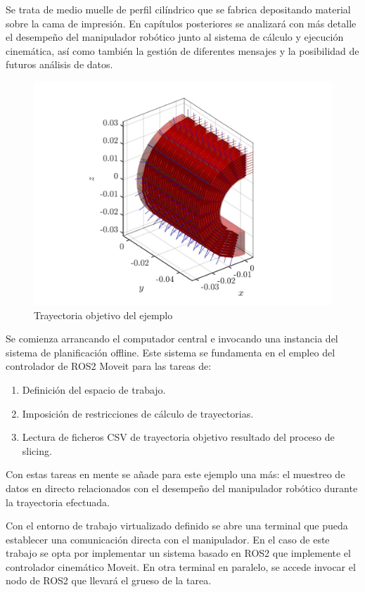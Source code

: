 Se trata de medio muelle de perfil cilíndrico que se fabrica depositando material sobre la cama de impresión. En capítulos posteriores se analizará con más detalle el desempeño del manipulador robótico junto al sistema de cálculo y ejecución cinemática, así como también la gestión de diferentes mensajes y la posibilidad de futuros análisis de datos.

\begin{figure}[h!]
    \centering
    \includegraphics[scale=0.3]{figuras/trayectoria_objetivo.jpg}
    \caption{Trayectoria objetivo del ejemplo}
    \label{fig:trayectoria_objetivo}
\end{figure}

Se comienza arrancando el computador central e invocando una instancia del sistema de planificación offline. Este sistema se fundamenta en el empleo del controlador de ROS2 Moveit para las tareas de:

\begin{enumerate}
    \item Definición del espacio de trabajo.
    \item Imposición de restricciones de cálculo de trayectorias.
    \item Lectura de ficheros CSV de trayectoria objetivo resultado del proceso de slicing.
\end{enumerate}

Con estas tareas en mente se añade para este ejemplo una más: el muestreo de datos en directo relacionados con el desempeño del manipulador robótico durante la trayectoria efectuada.  

Con el entorno de trabajo virtualizado definido se abre una terminal que pueda establecer una comunicación directa con el manipulador. En el caso de este trabajo se opta por implementar un sistema basado en ROS2 que implemente el controlador cinemático Moveit. En otra terminal en paralelo, se accede invocar el nodo de ROS2 que llevará el grueso de la tarea. 

